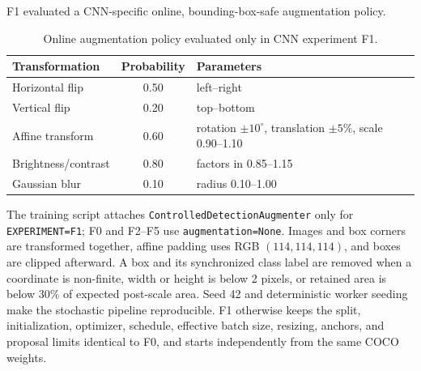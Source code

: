 \begin{table}[htbp]
  \centering
  \caption{Controlled CNN ablation sequence.}
  \label{tab:cnn-ablation}
\end{table}

F1 evaluated a CNN-specific online, bounding-box-safe augmentation policy.

\begin{table}[htbp]
  \centering
  \caption{Online augmentation policy evaluated only in CNN experiment F1.}
  \label{tab:augmentation}
  \begin{tabular}{lcl}
    \toprule
    Transformation & Probability & Parameters \\
    \midrule
    Horizontal flip       & 0.50 & left--right \\
    Vertical flip         & 0.20 & top--bottom \\
    Affine transform      & 0.60 & rotation $\pm10^{\circ}$, translation $\pm5\%$, scale 0.90--1.10 \\
    Brightness/contrast   & 0.80 & factors in 0.85--1.15 \\
    Gaussian blur         & 0.10 & radius 0.10--1.00 \\
    \bottomrule
  \end{tabular}
\end{table}

The training script attaches \texttt{ControlledDetectionAugmenter} only for
\texttt{EXPERIMENT=F1}; F0 and F2--F5 use \texttt{augmentation=None}. Images
and box corners are transformed together, affine padding uses RGB
$(114,114,114)$, and boxes are clipped afterward. A box and its synchronized
class label are removed when a coordinate is non-finite, width or height is
below 2 pixels, or retained area is below 30\% of expected post-scale area.
Seed 42 and deterministic worker seeding make the stochastic pipeline
reproducible. F1 otherwise keeps the split, initialization, optimizer,
schedule, effective batch size, resizing, anchors, and proposal limits
identical to F0, and starts independently from the same COCO weights.

